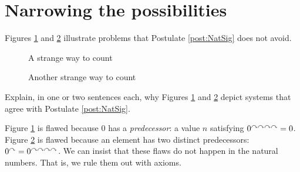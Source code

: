 \printbreak

\section{Narrowing the possibilities}

Figures \ref{fig:one-loop} and \ref{fig:two-loop} illustrate 
problems that Postulate \ref{post:NatSig} does not avoid.

\begin{figure}[ht]
  \centering
  \caption{A strange way to count}
  \label{fig:one-loop}
\end{figure}

\begin{figure}[ht]
  \centering
  \caption{Another strange way to count}
  \label{fig:two-loop}
\end{figure}
\clearpage

\begin{exer}
\begin{exercise}
\item Explain, in one or two sentences each, why Figures \ref{fig:one-loop} and \ref{fig:two-loop} depict systems that agree with Postulate \ref{post:NatSig}.
\end{exercise}
\end{exer}
\ipadbreak

Figure \ref{fig:one-loop} is flawed because $0$ has a
\emph{predecessor}: a value $n$ satisfying $0^{\curvearrowright\curvearrowright\curvearrowright\curvearrowright} = 0$. Figure
\ref{fig:two-loop} is flawed because an element has two distinct
predecessors: $0^\curvearrowright = 0^{\curvearrowright\curvearrowright\curvearrowright\curvearrowright}$.  We can insist that
these flaws do not happen in the natural numbers. That is, 
we rule them out with axioms.

